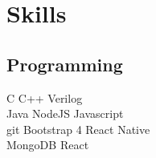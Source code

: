 \documentclass[]{deedy-resume-openfont}
\begin{document}
\begin{minipage}[t]{0.33\textwidth}
\vspace{\topsep}
\vspace{\topsep}
\section{Skills}
\vspace{\topsep}
\subsection{Programming}
C \textbullet{} C++ \textbullet{} Verilog \\
Java \textbullet{} NodeJS \textbullet{} Javascript\\
git \textbullet{} 
Bootstrap 4 \textbullet{} React Native\\ 
MongoDB  \textbullet{} React \\
\sectionsep

%
%

\end{minipage} 
\hfill
\end{document}
